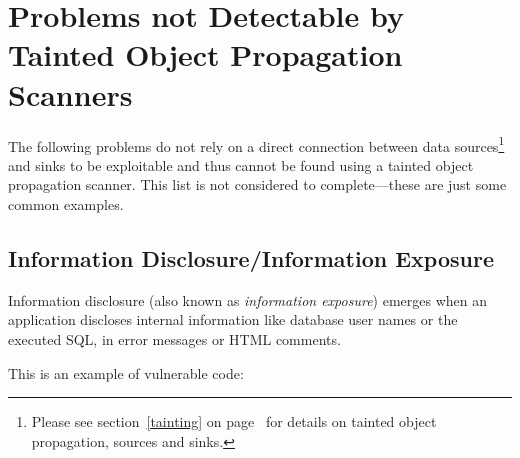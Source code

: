 \section{Problems not Detectable by Tainted Object Propagation Scanners}
The following problems do not rely on a direct connection between data sources\footnote{Please see section~\ref{tainting} on page~\pageref{tainting} for details on tainted object propagation, sources and sinks.} and sinks to be exploitable and thus cannot be found using a tainted object propagation scanner. This list is not considered to complete---these are just some common examples.



\subsection{Information Disclosure/Information Exposure}
\label{information-disclosure}
Information disclosure (also known as \emph{information exposure}) emerges when an application discloses internal information like database user names or the executed SQL, \eg in error messages or HTML comments.

This is an example of vulnerable code:


